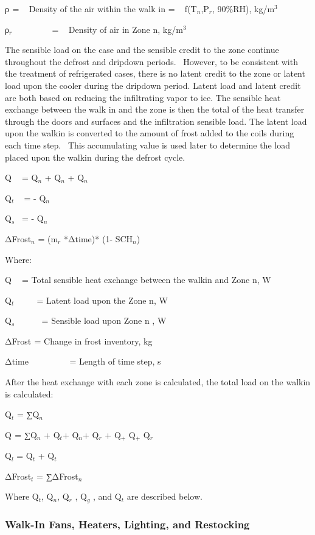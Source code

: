 ρ\(_{ }\) = ~ Density of the air within the walk in = ~ f(T\(_{n}\),P\(_{r}\), 90\%RH), kg/m\(^{3}\)

ρ\(_{r}\) ~~~~~~~~ = ~ Density of air in Zone n, kg/m\(^{3}\)

The sensible load on the case and the sensible credit to the zone continue throughout the defrost and dripdown periods.~ However, to be consistent with the treatment of refrigerated cases, there is no latent credit to the zone or latent load upon the cooler during the dripdown period. Latent load and latent credit are both based on reducing the infiltrating vapor to ice. The sensible heat exchange between the walk in and the zone is then the total of the heat transfer through the doors and surfaces and the infiltration sensible load. The latent load upon the walkin is converted to the amount of frost added to the coils during each time step.~ This accumulating value is used later to determine the load placed upon the walkin during the defrost cycle.

Q\(_{ }\) ~ = Q\(_{n}\) + Q\(_{n}\) + Q\(_{n}\)

Q\(_{t}\) ~ = - Q\(_{n}\)

Q\(_{s}\)~ = - Q\(_{n}\)

ΔFrost\(_{n}\) = (m\(_{r}\) *Δtime)* (1- SCH\(_{n}\))

Where:

Q\(_{ }\) ~ = Total sensible heat exchange between the walkin and Zone n, W

Q\(_{t}\) ~~~~ = Latent load upon the Zone n, W

Q\(_{s}\) ~~~~~ = Sensible load upon Zone n , W

ΔFrost\(_{ }\) = Change in frost inventory, kg

Δtime~~~~~~~~~ = Length of time step, s

After the heat exchange with each zone is calculated, the total load on the walkin is calculated:

Q\(_{t}\) = ∑Q\(_{n}\)

Q\(_{ }\) = ∑Q\(_{n}\) + Q\(_{t}\)+ Q\(_{n}\)+ Q\(_{r}\) + Q\(_{+}\) Q\(_{+}\) Q\(_{r}\)

Q\(_{l}\) = Q\(_{t}\) + Q\(_{t}\)

ΔFrost\(_{t}\) = ∑ΔFrost\(_{n}\)

Where Q\(_{t}\), Q\(_{n}\), Q\(_{r}\) , Q\(_{g}\) , and Q\(_{t}\) are described below.

\subsubsection{Walk-In Fans, Heaters, Lighting, and Restocking}\label{walk-in-fans-heaters-lighting-and-restocking}

